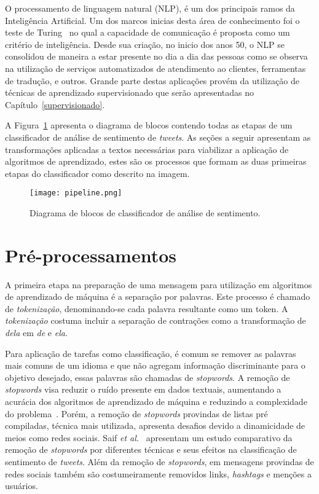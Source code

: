 O processamento de linguagem natural (NLP), é um dos principais ramos da Inteligência Artificial.
Um dos marcos inicias desta área de conhecimento foi o teste de Turing~\cite{turing50} no qual a capacidade
de comunicação é proposta como um critério de inteligência.
Desde sua criação, no inicio dos anos 50, o NLP se consolidou de maneira a estar presente no dia a dia das pessoas como
se observa na utilização de serviços automatizados de atendimento ao clientes, ferramentas de tradução, e outros.
Grande parte destas aplicações provém da utilização de técnicas de aprendizado supervisionado que serão apresentadas
no Capítulo~\ref{supervisionado}.

A Figura~\ref{fig:pipeline} apresenta o diagrama de blocos contendo todas as etapas de um classificador de análise de
sentimento de \textit{tweets}.
As seções a seguir apresentam as transformações aplicadas a textos necessárias para viabilizar a aplicação de algoritmos
de aprendizado, estes são os processos que formam as duas primeiras etapas do classificador como descrito na imagem.

\begin{figure}
\begin{center} {
    \begin{center}
    \texttt{[image: pipeline.png]}
    \caption{Diagrama de blocos de classificador de análise de sentimento.}
    \label{fig:pipeline}
    \end{center}
}
\end{center}
\end{figure}

\section{Pré-processamentos}

A primeira etapa na preparação de uma mensagem para utilização em algoritmos de aprendizado de máquina é a separação por
palavras.
Este processo é chamado de \textit{tokenização}, denominando-se cada palavra resultante como um token.
A \textit{tokenização} costuma incluir a separação de contrações como a transformação de \textit{dela} em \textit{de}
e \textit{ela}.


Para aplicação de tarefas como classificação, é comum se remover as palavras mais comuns de um idioma e que não
agregam informação discriminante para o objetivo desejado, essas palavras são chamadas de \textit{stopwords}.
A remoção de \textit{stopwords} visa reduzir o ruído presente em dados textuais, aumentando a acurácia dos algoritmos de
aprendizado de máquina e reduzindo a complexidade do problema~\cite{silva03}.
Porém, a remoção de \textit{stopwords} provindas de listas pré compiladas, técnica mais utilizada, apresenta desafios
devido a dinamicidade de meios como redes sociais.
Saif \textit{et al.}~\cite{saif14} apresentam um estudo comparativo da remoção de \textit{stopwords} por diferentes
técnicas e seus efeitos na classificação de sentimento de \textit{tweets}.
Além da remoção de \textit{stopwords}, em mensagens provindas de redes sociais também são costumeiramente removidos
links, \textit{hashtags} e menções a usuários.

